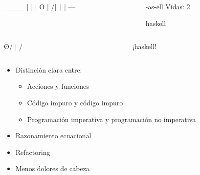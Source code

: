 \documentclass[spanish]{beamer}
\begin{document}

\begin{frame}[fragile]
  \begin{columns}[onlytextwidth,T]
    \begin{column}{.5\textwidth}
        \begin{code}
  ____
  |  |
  |  O
  | /|\
  |
  |
 ---
        \end{code}
    \end{column}
    \begin{column}{.5\textwidth}
      \begin{code}


 -as-ell          Vidas: 2

 haskell


      \end{code}
    \end{column}
  \end{columns}
\end{frame}


\begin{frame}[fragile]
  \begin{columns}[onlytextwidth,T]
    \begin{column}{.5\textwidth}
        \begin{code}


    \O/
     |
    / \


        \end{code}
    \end{column}
    \begin{column}{.5\textwidth}
      \begin{code}


¡haskell!




      \end{code}
    \end{column}
  \end{columns}
\end{frame}


\begin{frame}
  \begin{itemize}
  \item
    Distinción clara entre:
    \begin{itemize}
    \item Acciones y funciones
    \item Código impuro y código impuro
    \item Programación imperativa y programación no imperativa
    \end{itemize}
  \item
    Razonamiento ecuacional
  \item
    Refactoring
  \item
    Menos dolores de cabeza
  \end{itemize}
\end{frame}
\end{document}
